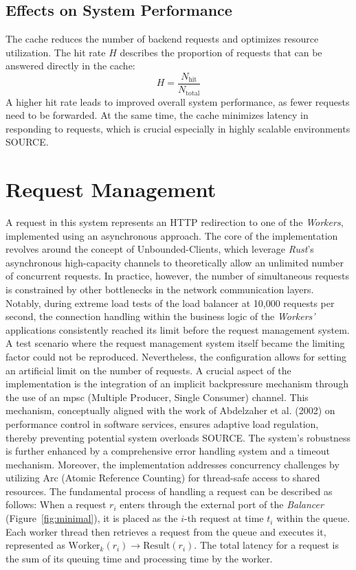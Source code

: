 \documentclass[twocolumn]{webofc}
\begin{document}
\subsection{Effects on System Performance}
The cache reduces the number of backend requests and optimizes resource utilization. The hit rate \( H \) describes the proportion of requests that can be answered directly in the cache:
\[
H = \frac{N_{\text{hit}}}{N_{\text{total}}}
\]
A higher hit rate leads to improved overall system performance, as fewer requests need to be forwarded. At the same time, the cache minimizes latency in responding to requests, which is crucial especially in highly scalable environments {\color{red} SOURCE}.

\section{Request Management}
A request in this system represents an HTTP redirection to one of the \textit{Workers}, implemented using an asynchronous approach. The core of the implementation revolves around the concept of Unbounded-Clients, which leverage \textit{Rust}'s asynchronous high-capacity channels to theoretically allow an unlimited number of concurrent requests. In practice, however, the number of simultaneous requests is constrained by other bottlenecks in the network communication layers. Notably, during extreme load tests of the load balancer at 10,000 requests per second, the connection handling within the business logic of the \textit{Workers'} applications consistently reached its limit before the request management system. A test scenario where the request management system itself became the limiting factor could not be reproduced. Nevertheless, the configuration allows for setting an artificial limit on the number of requests. A crucial aspect of the implementation is the integration of an implicit backpressure mechanism through the use of an mpsc (Multiple Producer, Single Consumer) channel. This mechanism, conceptually aligned with the work of Abdelzaher et al. (2002) on performance control in software services, ensures adaptive load regulation, thereby preventing potential system overloads {\color{red} SOURCE}. The system's robustness is further enhanced by a comprehensive error handling system and a timeout mechanism. Moreover, the implementation addresses concurrency challenges by utilizing Arc (Atomic Reference Counting) for thread-safe access to shared resources. The fundamental process of handling a request can be described as follows: When a request \( r_i \) enters through the external port of the \textit{Balancer} (Figure~\ref{fig:minimal}), it is placed as the \( i \)-th request at time \( t_i \) within the queue. Each worker thread then retrieves a request from the queue and executes it, represented as \( \text{Worker}_k(r_i) \rightarrow \text{Result}(r_i) \). The total latency for a request is the sum of its queuing time and processing time by the worker.
\end{document}
